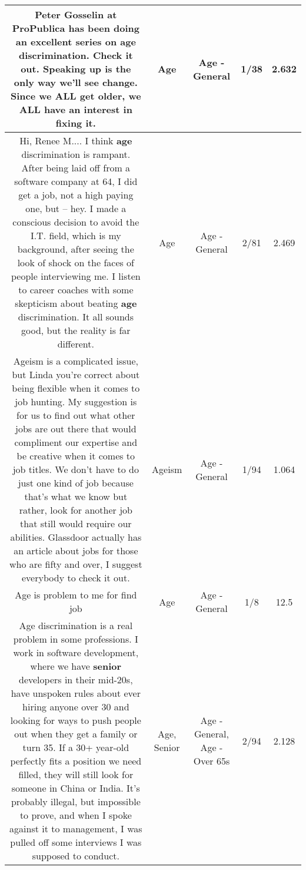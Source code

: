 \documentclass[11pt]{article}
\newlength\mylength
\begin{document}
\begin{center}
\begin{longtable}{|C{.65\mylength}|C{.30\mylength}|C{.12\mylength}|C{.12\mylength}|C{.12\mylength}|}
  \small Peter Gosselin at ProPublica has been doing an excellent series on \textbf{age} discrimination.  Check it out.  Speaking up is the only way we'll see change.  Since we ALL get older, we ALL have an interest in fixing it.\normalsize   & Age & Age - General & 1/38 & 2.632 \\  \hline
  \small Hi, Renee M.... I think \textbf{age} discrimination is rampant. After being laid off from a software company at 64, I did get a job, not a high paying one, but -- hey.  I made a conscious decision to avoid the I.T. field, which is my background, after seeing the look of shock on the faces of people interviewing me.  I listen to career coaches with some skepticism about beating \textbf{age} discrimination.  It all sounds good, but the reality is far different.\normalsize   & Age & Age - General & 2/81 & 2.469 \\  \hline
  \small Ageism is a complicated issue, but Linda you're correct about being flexible when it comes to job hunting. My suggestion is for us to find out what other jobs are out there that would compliment our expertise and be creative when it comes to job titles. We don't have to do just one kind of job because that's what we know but rather, look for another job that still would require our abilities. Glassdoor actually has an article about jobs for those who are fifty and over, I suggest everybody to check it out.\normalsize   & Ageism & Age - General & 1/94 & 1.064 \\  \hline
  \small Age is problem to me for find job\normalsize   & Age & Age - General & 1/8 & 12.5 \\  \hline
  \small Age discrimination is a real problem in some professions. I work in software development, where we have \textbf{senior} developers in their mid-20s, have unspoken rules about ever hiring anyone over 30 and looking for ways to push people out when they get a family or turn 35. If a 30+ year-old perfectly fits a position we need filled, they will still look for someone in China or India. It's probably illegal, but impossible to prove, and when I spoke against it to management, I was pulled off some interviews I was supposed to conduct.\normalsize   & Age, Senior & Age - General, Age - Over 65s & 2/94 & 2.128 \\  \hline

\end{longtable}
\end{center}
\end{document}
